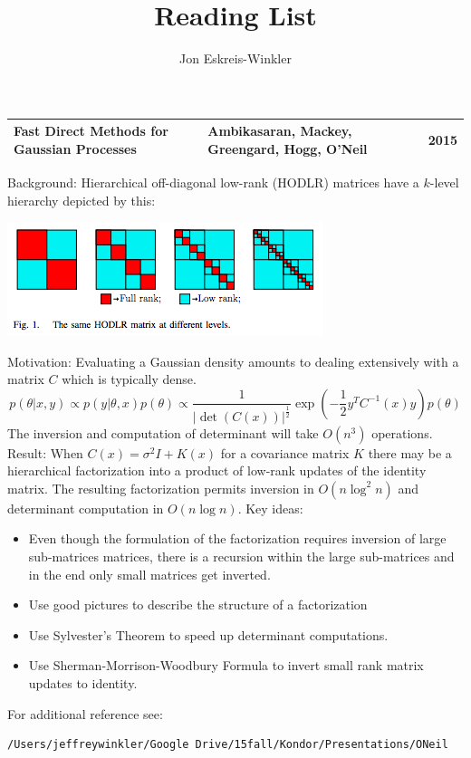 \documentclass[11pt, oneside]{article}   	%
\title{Reading List}
\author{Jon Eskreis-Winkler}
\begin{document}
\maketitle


\begin{center}\begin{tabular}{| l| l| l|} \hline
Fast Direct Methods for Gaussian Processes & Ambikasaran, Mackey, Greengard, Hogg, \textbf{O'Neil} & 2015 \\ \hline
\end{tabular}\end{center}
Background: Hierarchical off-diagonal low-rank (HODLR) matrices have a $k$-level hierarchy depicted by this:
\begin{center}\includegraphics[scale=0.5]{HODLR.png} \end{center}
Motivation: Evaluating a Gaussian density amounts to dealing extensively with a matrix $C$ which is typically dense.
$$p(\theta|x,y) \propto p(y|\theta,x)p(\theta) \propto  \frac{1}{|\det(C(x))|^\frac{1}{2}} \exp \left(-\frac{1}{2} y^T C^{-1}(x)y \right)p(\theta)$$
The inversion and computation of determinant will take $O(n^3)$ operations. 
Result: When $C(x) = \sigma^2I+K(x)$ for a covariance matrix $K$ there may be a hierarchical factorization into a product of low-rank updates of the identity matrix. The resulting factorization permits inversion in $O(n\log^2 n)$ and determinant computation in $O(n\log n)$.
Key ideas:
\begin{itemize}
\item Even though the formulation of the factorization requires inversion of large sub-matrices matrices, there is a recursion within the large sub-matrices and in the end only small matrices get inverted.
\item Use good pictures to describe the structure of a factorization
\item Use Sylvester's Theorem to speed up determinant computations.
\item Use Sherman-Morrison-Woodbury Formula to invert small rank matrix updates to identity.
\end{itemize}
For additional reference see: 
\begin{verbatim}
/Users/jeffreywinkler/Google Drive/15fall/Kondor/Presentations/ONeil
\end{verbatim}
\end{document}

